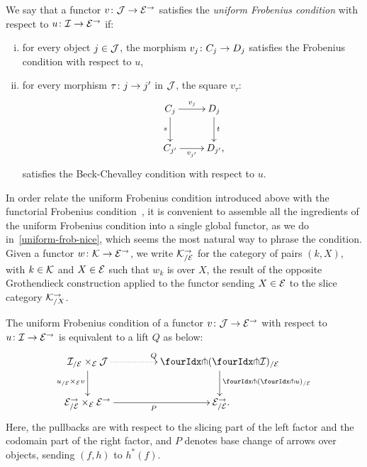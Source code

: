 \documentclass[reqno,10pt,a4paper,oneside,draft]{amsart}
\begin{document}
\begin{definition} \label{def:uniFrobcond}
We say that a functor $v \co \cal{J} \to \catE^\to$ satisfies the \emph{uniform Frobenius condition} with respect to $u \co \cal{I} \to \cal{E}^\to$ if:
\begin{enumerate}[(i)]
\item for every object $j \in \cal{J}$, the morphism $v_j \co C_j \to D_j$ satisfies the Frobenius condition with respect to $u$,
\item for every morphism $\tau \co j \to j'$ in $\cal{J}$, the square $v_\tau$:
\[
\xymatrix{
  C_j
  \ar[r]^{v_j}
  \ar[d]_{s}
&
  D_j
  \ar[d]^{t}
\\
  C_{j'}
  \ar[r]_-{v_{j'}}
&
  D_{j'}
\rlap{,}}
\]
satisfies the Beck-Chevalley condition with respect to $u$.
\end{enumerate} 
\end{definition}

In order relate the uniform Frobenius condition introduced above with the functorial Frobenius condition~\cite{garner:topological-simplicial}, it is convenient 
to assemble all the ingredients of the uniform Frobenius condition into a single global functor, as we do in~\cref{uniform-frob-nice}, which seems the most natural way to phrase the condition.
Given a functor $w \co \cal{K} \to \cal{E}^\to$, we write $\cal{K}_{/\cal{E}}^{\to}$ for the category of 
pairs $(k, X)$, with $k \in \cal{K}$ and $X \in \cal{E}$ such that $w_k$ is over $X$, \ie the result of
the opposite Grothendieck construction applied to the functor sending $X \in \cal{E}$ to the slice category $\cal{K}_{/X}^{\to}$.

\begin{proposition}
\label{uniform-frob-nice}
The uniform Frobenius condition of a functor $v \co \cal{J} \to \cal{E}^\to$ with respect to $u \co \cal{I} \to \cal{E}^\to$ is equivalent to a lift $Q$ as below:
\begin{equation} \label{uniform-frob-nice:lift}
\begin{gathered}
\xymatrix@C+2em{
  \cal{I}_{/\cal{E}} \times_{\cal{E}} \cal{J}
  \ar@{.>}[r]^{Q}
  \ar[d]_{u_{/\cal{E}} \times_{\cal{E}} v}
&
  \liftl{(\liftr{\cal{I}})}_{/\cal{E}}
  \ar[d]^{\liftl{(\liftr{u})}_{/\cal{E}}}
\\
  \cal{E}^\to_{/\cal{E}} \times_{\cal{E}} \cal{E}^\to
  \ar[r]_{P}
&
  \cal{E}_{/\cal{E}}^\to
\rlap{.}}
\end{gathered}
\end{equation}
Here, the pullbacks are with respect to the slicing part of the left factor and the codomain part of the right factor, and $P$ denotes base change of arrows over objects, sending $(f, h)$ to $h^*(f)$.
\end{proposition}
\end{document}
